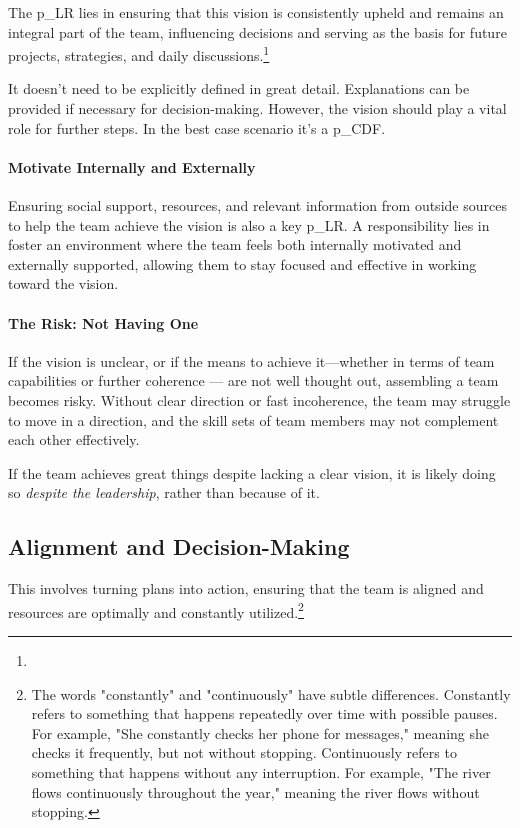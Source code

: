 The \gls{p_LR} lies in ensuring that this vision is consistently upheld and remains an integral part of the team, influencing decisions and serving as the basis for future projects, strategies, and daily discussions.\footnote{
}

It doesn’t need to be explicitly defined in great detail. Explanations can be provided if necessary for decision-making. However, the vision should play a vital role for further steps. In the best case scenario it's a \gls{p_CDF}.

\paragraph{Motivate Internally and Externally}
Ensuring social support, resources, and relevant information from outside sources to help the team achieve the vision is also a key \gls{p_LR}. A responsibility lies in foster an environment where the team feels both internally motivated and externally supported, allowing them to stay focused and effective in working toward the vision.

\paragraph{The Risk: Not Having One}
If the vision is unclear, or if the means to achieve it—whether in terms of team capabilities or further coherence — are not well thought out, assembling a team becomes risky. Without clear direction or fast incoherence, the team may struggle to move in a direction, and the skill sets of team members may not complement each other effectively.

If the team achieves great things despite lacking a clear vision, it is likely doing so \textit{despite the leadership}, rather than because of it.

\subsection{Alignment and Decision-Making} \label{responsibility__alignment}
This involves turning plans into action, ensuring that the team is aligned and resources are optimally and constantly utilized.\footnote{
	The words "constantly" and "continuously" have subtle differences. Constantly refers to something that happens repeatedly over time with possible pauses. For example, "She constantly checks her phone for messages," meaning she checks it frequently, but not without stopping. Continuously refers to something that happens without any interruption. For example, "The river flows continuously throughout the year," meaning the river flows without stopping.
}

